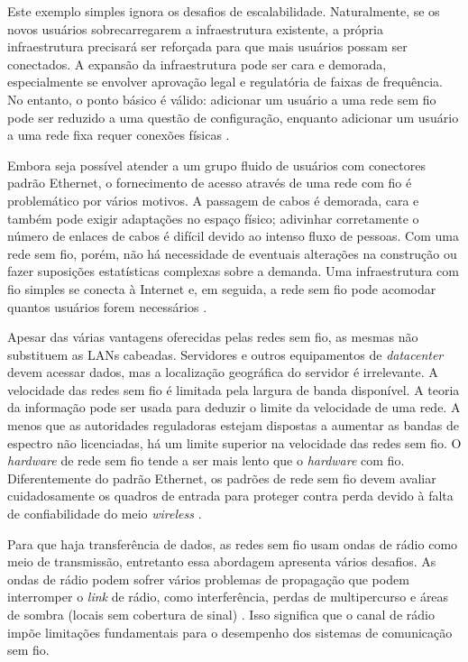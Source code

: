 Este exemplo simples ignora os desafios de escalabilidade. Naturalmente, se os novos usuários sobrecarregarem a infraestrutura existente, a própria infraestrutura precisará ser reforçada para que mais usuários possam ser conectados. A expansão da infraestrutura pode ser cara e demorada, especialmente se envolver aprovação legal e regulatória de faixas de frequência. No entanto, o ponto básico é válido: adicionar um usuário a uma rede sem fio pode ser reduzido a uma questão de configuração, enquanto adicionar um usuário a uma rede fixa requer conexões físicas \cite{gast2002}.

Embora seja possível atender a um grupo fluido de usuários com conectores padrão Ethernet, o fornecimento de acesso através de uma rede com fio é problemático por vários motivos. A passagem de cabos é demorada, cara e também pode exigir adaptações no espaço físico; adivinhar corretamente o número de enlaces de cabos é difícil devido ao intenso fluxo de pessoas. Com uma rede sem fio, porém, não há necessidade de eventuais alterações na construção ou fazer suposições estatísticas complexas sobre a demanda. Uma infraestrutura com fio simples se conecta à Internet e, em seguida, a rede sem fio pode acomodar quantos usuários forem necessários \cite{gast2002}.

Apesar das várias vantagens oferecidas pelas redes sem fio, as mesmas não substituem as LANs cabeadas. Servidores e outros equipamentos de \textit{datacenter} devem acessar dados, mas a localização geográfica do servidor é irrelevante. A velocidade das redes sem fio é limitada pela largura de banda disponível. A teoria da informação pode ser usada para deduzir o limite da velocidade de uma rede. A menos que as autoridades reguladoras estejam dispostas a aumentar as bandas de espectro não licenciadas, há um limite superior na velocidade das redes sem fio. O \textit{hardware} de rede sem fio tende a ser mais lento que o \textit{hardware} com fio. Diferentemente do padrão Ethernet, os padrões de rede sem fio devem avaliar cuidadosamente os quadros de entrada para proteger contra perda devido à falta de confiabilidade do meio \textit{wireless} \cite{gast2002}.

Para que haja transferência de dados, as redes sem fio usam ondas de rádio como meio de transmissão, entretanto essa abordagem apresenta vários desafios. As ondas de rádio podem sofrer vários problemas de propagação que podem interromper o \textit{link} de rádio, como interferência, perdas de multipercurso e áreas de sombra (locais sem cobertura de sinal) \cite{gast2002}. Isso significa que o canal de rádio impõe limitações fundamentais para o desempenho dos sistemas de comunicação sem fio.

